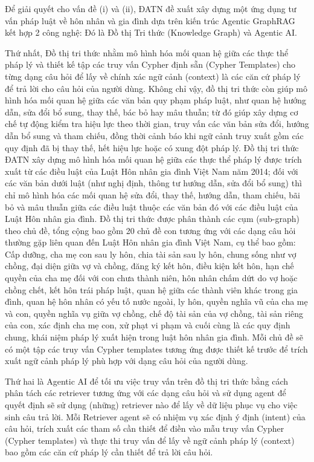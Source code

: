 \documentclass[../DoAn.tex]{subfiles}
\begin{document}
Để giải quyết cho vấn đề (i) và (ii), ĐATN đề xuất xây dựng một ứng dụng tư vấn pháp luật về hôn nhân và gia đình dựa trên kiến trúc Agentic GraphRAG kết hợp 2 công nghệ: Đó là Đồ thị Tri thức (Knowledge Graph) và Agentic AI.


Thứ nhất, Đồ thị tri thức nhằm mô hình hóa mối quan hệ giữa các thực thể pháp lý và thiết kế tập các truy vấn Cypher định sẵn (Cypher Templates) cho từng dạng câu hỏi để lấy về chính xác ngữ cảnh (context) là các căn cứ pháp lý để trả lời cho câu hỏi của người dùng. Không chỉ vậy, đồ thị tri thức còn giúp mô hình hóa mối quan hệ giữa các văn bản quy phạm pháp luật, như quan hệ hướng dẫn, sửa đổi bổ sung, thay thế, bác bỏ hay mâu thuẫn; từ đó giúp xây dựng cơ chế tự động kiểm tra hiệu lực theo thời gian, truy vấn các văn bản sửa đổi, hướng dẫn bổ sung và tham chiếu, đồng thời cảnh báo khi ngữ cảnh truy xuất gồm các quy định đã bị thay thế, hết hiệu lực hoặc có xung đột pháp lý. Đồ thị tri thức ĐATN xây dựng mô hình hóa mối quan hệ giữa các thực thể pháp lý được trích xuất từ các điều luật của Luật Hôn nhân gia đình Việt Nam năm 2014; đối với các văn bản dưới luật (như nghị định, thông tư hướng dẫn, sửa đổi bổ sung) thì chỉ mô hình hóa các mối quan hệ sửa đổi, thay thế, hướng dẫn, tham chiếu, bãi bỏ và mâu thuẫn giữa các điều luật thuộc các văn bản đó với các điều luật của Luật Hôn nhân gia đình. Đồ thị tri thức được phân thành các cụm (sub-graph) theo chủ đề, tổng cộng bao gồm 20 chủ đề con tương ứng với các dạng câu hỏi thường gặp liên quan đến Luật Hôn nhân gia đình Việt Nam, cụ thể bao gồm: Cấp dưỡng, cha mẹ con sau ly hôn, chia tài sản sau ly hôn, chung sống như vợ chồng, đại diện giữa vợ và chồng, đăng ký kết hôn, điều kiện kết hôn, hạn chế quyền của cha mẹ đối với con chưa thành niên, hôn nhân chấm dứt do vợ hoặc chồng chết, kết hôn trái pháp luật, quan hệ giữa các thành viên khác trong gia đình, quan hệ hôn nhân có yếu tố nước ngoài, ly hôn, quyền nghĩa vũ của cha mẹ và con, quyền nghĩa vụ giữa vợ chồng, chế độ tài sản của vợ chồng, tài sản riêng của con, xác định cha mẹ con, xử phạt vi phạm và cuối cùng là các quy định chung, khái niệm pháp lý xuất hiện trong luật hôn nhân gia đình. Mỗi chủ đề sẽ có một tập các truy vấn Cypher templates tương ứng được thiết kế trước để trích xuất ngữ cảnh pháp lý phù hợp với dạng câu hỏi của người dùng.


Thứ hai là Agentic AI để tối ưu việc truy vấn trên đồ thị tri thức bằng cách phân tách các retriever tương ứng với các dạng câu hỏi và sử dụng agent để quyết định sẽ sử dụng (những) retriever nào để lấy về dữ liệu phục vụ cho việc sinh câu trả lời. Mỗi Retriever agent sẽ có nhiệm vụ xác định ý định (intent) của câu hỏi, trích xuất các tham số cần thiết để điền vào mẫu truy vấn Cypher (Cypher templates) và thực thi truy vấn để lấy về ngữ cảnh pháp lý (context) bao gồm các căn cứ pháp lý cần thiết để trả lời câu hỏi.
\end{document}
